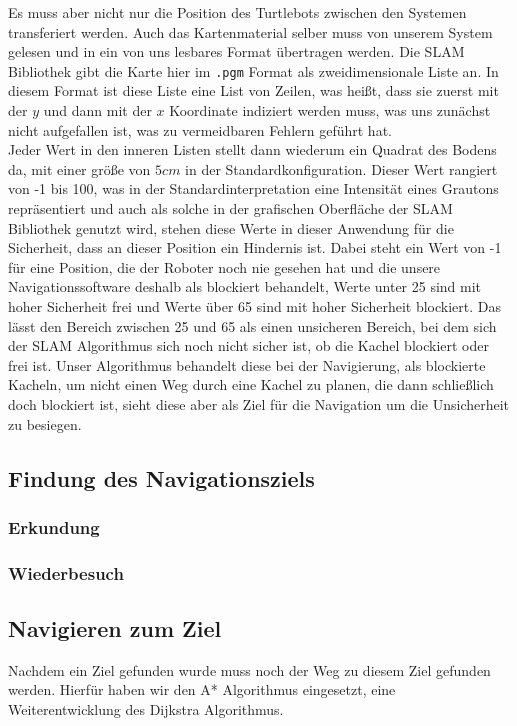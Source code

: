 Es muss aber nicht nur die Position des Turtlebots zwischen den Systemen transferiert werden.
Auch das Kartenmaterial selber muss von unserem System gelesen und in ein von uns lesbares Format übertragen werden.
Die SLAM Bibliothek gibt die Karte hier im \lstinline{.pgm} Format als zweidimensionale Liste an.
In diesem Format ist diese Liste eine List von Zeilen, was heißt, dass sie zuerst mit der $y$ und dann mit der $x$
Koordinate indiziert werden muss, was uns zunächst nicht aufgefallen ist, was zu vermeidbaren Fehlern geführt hat.\\

Jeder Wert in den inneren Listen stellt dann wiederum ein Quadrat des Bodens da, mit einer größe von $5cm$ in der
Standardkonfiguration.
Dieser Wert rangiert von -1 bis 100, was in der Standardinterpretation eine Intensität eines Grautons repräsentiert und
auch als solche in der grafischen Oberfläche der SLAM Bibliothek genutzt wird, stehen diese Werte in dieser Anwendung
für die Sicherheit, dass an dieser Position ein Hindernis ist.
Dabei steht ein Wert von -1 für eine Position, die der Roboter noch nie gesehen hat und die unsere Navigationssoftware
deshalb als blockiert behandelt, Werte unter 25 sind mit hoher Sicherheit frei und Werte über 65 sind mit hoher Sicherheit
blockiert.
Das lässt den Bereich zwischen 25 und 65 als einen unsicheren Bereich, bei dem sich der SLAM Algorithmus sich noch nicht
sicher ist, ob die Kachel blockiert oder frei ist.
Unser Algorithmus behandelt diese bei der Navigierung, als blockierte Kacheln, um nicht einen Weg durch eine Kachel zu planen,
die dann schließlich doch blockiert ist, sieht diese aber als Ziel für die Navigation um die Unsicherheit zu besiegen.

\subsection{Findung des Navigationsziels}\label{subsec:findung-des-navigationsziels}

\subsubsection{Erkundung}
\subsubsection{Wiederbesuch}
\subsection{Navigieren zum Ziel}\label{subsec:navigierung-zum-ziel}
Nachdem ein Ziel gefunden wurde muss noch der Weg zu diesem Ziel gefunden werden.
Hierfür haben wir den A* Algorithmus eingesetzt, eine Weiterentwicklung des Dijkstra Algorithmus.
